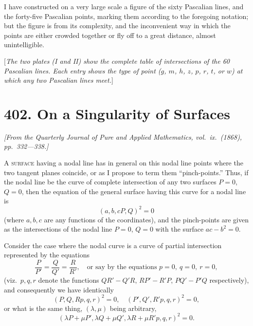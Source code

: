 \documentclass[11pt,a4paper]{article}
\theoremstyle{definition}
\begin{document}
I have constructed on a very large scale a figure of the sixty Pascalian lines, and the forty-five Pascalian points, marking them according to the foregoing notation; but the figure is from its complexity, and the inconvenient way in which the points are either crowded together or fly off to a great distance, almost unintelligible.

\bigskip

[\textit{The two plates (I and II) show the complete table of intersections of the 60 Pascalian lines. Each entry shows the type of point ($g$, $m$, $h$, $z$, $p$, $r$, $t$, or $w$) at which any two Pascalian lines meet.}]

\newpage


\section*{402. On a Singularity of Surfaces}

\begin{flushright}
\textit{[From the Quarterly Journal of Pure and Applied Mathematics, vol.\ ix.\ (1868), pp.~332---338.]}
\end{flushright}

\vspace{0.5em}

A \textsc{surface} having a nodal line has in general on this nodal line points where the two tangent planes coincide, or as I propose to term them ``pinch-points.'' Thus, if the nodal line be the curve of complete intersection of any two surfaces $P = 0$, $Q = 0$, then the equation of the general surface having this curve for a nodal line is
\[
(a,b,c P,Q)^2 = 0
\]
(where $a, b, c$ are any functions of the coordinates), and the pinch-points are given as the intersections of the nodal line $P = 0$, $Q = 0$ with the surface $ac - b^2 = 0$.

Consider the case where the nodal curve is a curve of partial intersection represented by the equations
\[
\frac{P}{P'} = \frac{Q}{Q'} = \frac{R}{R'},\quad \text{or say by the equations } p = 0,\ q = 0,\ r = 0,
\]
(viz.\ $p, q, r$ denote the functions $QR' - Q'R$, $RP' - R'P$, $PQ' - P'Q$ respectively), and consequently we have identically
\[
(P,Q,R p,q,r)^2 = 0,\quad (P',Q',R' p,q,r)^2 = 0,
\]
or what is the same thing, $(\lambda, \mu)$ being arbitrary,
\[
(\lambda P + \mu P', \lambda Q + \mu Q', \lambda R + \mu R' p,q,r)^2 = 0.
\]
\end{document}
